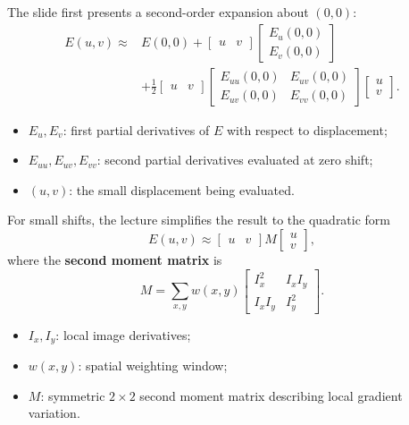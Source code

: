 \documentclass[11pt,a4paper,oneside]{report}
\newcommand{\mathlegend}[1]{%
  \par\vspace{0.2em}{\small\itshape where}\par
  \begin{itemize}[leftmargin=1.7em,topsep=0.15em,itemsep=0.12em]
  #1
  \end{itemize}
}
\begin{document}
The slide first presents a second-order expansion about $(0,0)$:
\begin{equation}
\begin{aligned}
E(u,v)\approx{}&E(0,0)
+\begin{bmatrix}u&v\end{bmatrix}
\begin{bmatrix}E_u(0,0)\\E_v(0,0)\end{bmatrix}\\
&+\frac12
\begin{bmatrix}u&v\end{bmatrix}
\begin{bmatrix}E_{uu}(0,0)&E_{uv}(0,0)\\E_{uv}(0,0)&E_{vv}(0,0)\end{bmatrix}
\begin{bmatrix}u\\v\end{bmatrix}.
\end{aligned}
\label{eq:harris-taylor}
\end{equation}
\mathlegend{
  \item $E_u,E_v$: first partial derivatives of $E$ with respect to displacement;
  \item $E_{uu},E_{uv},E_{vv}$: second partial derivatives evaluated at zero shift;
  \item $(u,v)$: the small displacement being evaluated.
}

For small shifts, the lecture simplifies the result to the quadratic form
\begin{equation}
  E(u,v)\approx
  \begin{bmatrix}u&v\end{bmatrix}M
  \begin{bmatrix}u\\v\end{bmatrix},
  \label{eq:harris-quadratic}
\end{equation}
where the \textbf{second moment matrix} is
\begin{equation}
  M=\sum_{x,y}w(x,y)
  \begin{bmatrix}
    I_x^2&I_xI_y\\
    I_xI_y&I_y^2
  \end{bmatrix}.
  \label{eq:harris-M}
\end{equation}
\mathlegend{
  \item $I_x,I_y$: local image derivatives;
  \item $w(x,y)$: spatial weighting window;
  \item $M$: symmetric $2\times2$ second moment matrix describing local gradient variation.
}
\end{document}
